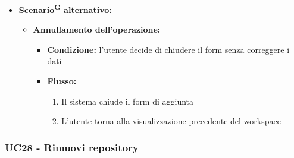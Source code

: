 \documentclass[a4paper, 11pt]{article}
\begin{document}
\begin{itemize}
\begin{enumerate}
		\item Il sistema rileva un errore durante la validazione o la connessione
		\item Il sistema annulla l'operazione di aggiunta
		\item Il sistema mostra un messaggio di errore specifico, a seconda della causa:
		\begin{itemize}
			\item \textbf{Link repository non valido}: verifica il formato dell'URL
			\item \textbf{Repository non trovata}: verifica che l'URL sia corretto, che la repository esista
			\item \textbf{Token non valido}: verifica il PAT
			\item \textbf{Permessi insufficienti}: il PAT non ha accesso alla repository
			\item \textbf{Repository già presente}: repository già presente nel workspace
			\item \textbf{Errore di connessione}: errore di connessione con GitHub\textsuperscript{G}, riprova più tardi
			\item \textbf{Branch\textsuperscript{G} non trovato}: il branch\textsuperscript{G} develop non esiste nella repository
		\end{itemize}
		\item Il sistema mantiene aperto il form di aggiunta per permettere correzioni o annullamento
	\end{enumerate}
	\item \textbf{Scenario\textsuperscript{G} alternativo:}
	\begin{itemize}
		\item \textbf{Annullamento dell'operazione:} 
			\begin{itemize}
				\item \textbf{Condizione:} l'utente decide di chiudere il form senza correggere i dati
				\item \textbf{Flusso:} 
				\begin{enumerate}
					\item Il sistema chiude il form di aggiunta
					\item L'utente torna alla visualizzazione precedente del workspace
				\end{enumerate}
			\end{itemize}
	\end{itemize}
\end{itemize}

\subsubsection{UC28 - Rimuovi repository} \label{UC28}
\end{document}
